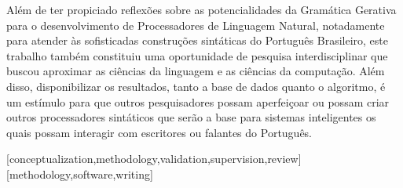 \documentclass[portuguese]{textolivre}
\begin{document}
Além de ter propiciado reflexões sobre as potencialidades da Gramática Gerativa para o desenvolvimento de Processadores de Linguagem Natural, notadamente para atender às sofisticadas construções sintáticas do Português Brasileiro, este trabalho também constituiu uma oportunidade de pesquisa interdisciplinar que buscou aproximar as ciências da linguagem e as ciências da computação. Além disso, disponibilizar os resultados, tanto a base de dados quanto o algoritmo, é um estímulo para que outros pesquisadores possam aperfeiçoar ou possam criar outros processadores sintáticos que serão a base para sistemas inteligentes os quais possam interagir com escritores ou falantes do Português.

\printbibliography\label{sec-bib}


\begin{contributors}
[conceptualization,methodology,validation,supervision,review]
[methodology,software,writing]
\end{contributors}

\newpage
\appendix
\end{document}
